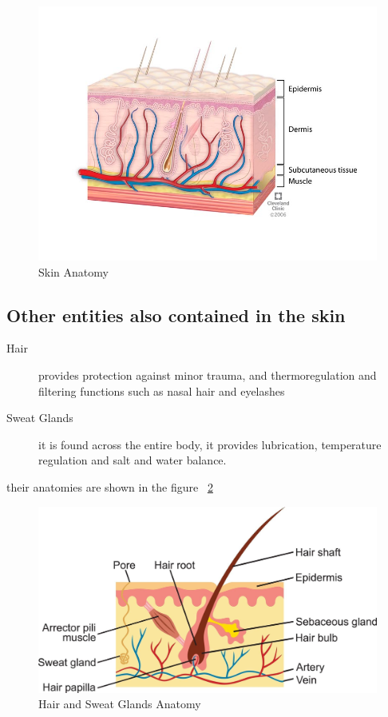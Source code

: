 \begin{figure}[htbp]
\begin{center}
\includegraphics[width=15cm]{./chapter-01-general-medical-information/skin-anatomy.jpg}
\end{center}
\caption{Skin Anatomy ~\cite{fig-skin}}
\label{fig:skin}
\end{figure}

\subsection{Other entities also contained in the skin}
\begin{description}
\item[Hair]  provides protection against minor trauma, and thermoregulation and filtering functions such as nasal hair and eyelashes
\item[Sweat Glands] it is found across the entire body, it provides lubrication, temperature regulation and salt and water balance.
\end{description}
their anatomies are shown in the figure ~\ref{fig:hair}

\begin{figure}[htbp]
\begin{center}
\includegraphics[width=15cm]{./chapter-01-general-medical-information/hair-sweat-gland.jpg}
\end{center}
\caption{Hair and Sweat Glands Anatomy ~\cite{fig-hair}}
\label{fig:hair}
\end{figure}


